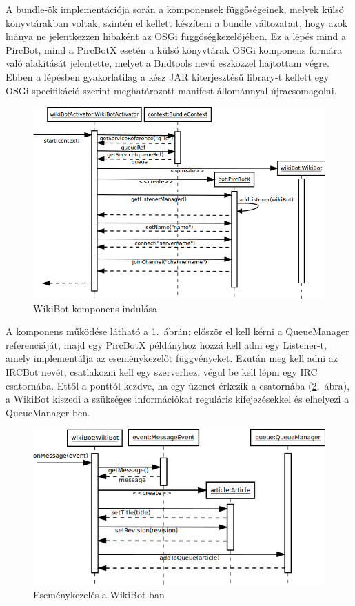 A bundle-ök implementációja során a komponensek függőségeinek, melyek külső könyvtárakban voltak, szintén el kellett készíteni a bundle változatait, hogy azok hiánya ne jelentkezzen hibaként az OSGi függőségkezelőjében. Ez a lépés mind a PircBot, mind a PircBotX esetén a külső könyvtárak OSGi komponens formára való alakítását jelentette, melyet a Bndtools nevű eszközzel hajtottam végre. Ebben a lépésben gyakorlatilag a kész JAR kiterjesztésű library-t kellett egy OSGi specifikáció szerint meghatározott manifest állománnyal újracsomagolni.

\begin{figure}[htp]
\centering
\includegraphics[scale=0.5]{img/sequence_wikiBot}
\caption{WikiBot komponens indulása}
\label{fig:sequence_wikiBot}
\end{figure}

A komponens működése látható a \ref{fig:sequence_wikiBot}.~ábrán: először el kell kérni a QueueManager referenciáját, majd egy PircBotX példányhoz hozzá kell adni egy Listener-t, amely implementálja az eseménykezelőt függvényeket. Ezután meg kell adni az IRCBot nevét, csatlakozni kell egy szerverhez, végül be kell lépni egy IRC csatornába. Ettől a ponttól kezdve, ha egy üzenet érkezik a csatornába (\ref{fig:sequence_wikiBot2}.~ábra), a WikiBot kiszedi a szükséges információkat reguláris kifejezésekkel és elhelyezi a QueueManager-ben.

\begin{figure}[htp]
\centering
\includegraphics[scale=0.5]{img/sequence_wikiBot2}
\caption{Eseménykezelés a WikiBot-ban}
\label{fig:sequence_wikiBot2}
\end{figure}

